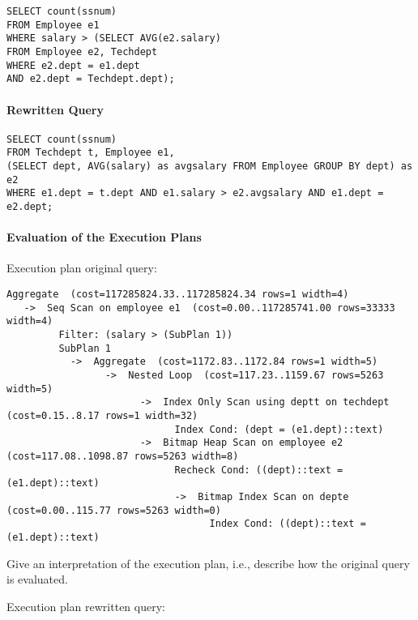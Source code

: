 \documentclass[11pt]{scrartcl}
\begin{document}
{\small
\begin{verbatim}
SELECT count(ssnum)
FROM Employee e1
WHERE salary > (SELECT AVG(e2.salary)
FROM Employee e2, Techdept
WHERE e2.dept = e1.dept
AND e2.dept = Techdept.dept);
\end{verbatim}
}

\paragraph{Rewritten Query}

{\small
\begin{verbatim}
SELECT count(ssnum)
FROM Techdept t, Employee e1, 
(SELECT dept, AVG(salary) as avgsalary FROM Employee GROUP BY dept) as e2
WHERE e1.dept = t.dept AND e1.salary > e2.avgsalary AND e1.dept = e2.dept;
\end{verbatim}
}

\paragraph{Evaluation of the Execution Plans}

Execution plan original query:

\begin{verbatim}
Aggregate  (cost=117285824.33..117285824.34 rows=1 width=4)
   ->  Seq Scan on employee e1  (cost=0.00..117285741.00 rows=33333 width=4)
         Filter: (salary > (SubPlan 1))
         SubPlan 1
           ->  Aggregate  (cost=1172.83..1172.84 rows=1 width=5)
                 ->  Nested Loop  (cost=117.23..1159.67 rows=5263 width=5)
                       ->  Index Only Scan using deptt on techdept  (cost=0.15..8.17 rows=1 width=32)
                             Index Cond: (dept = (e1.dept)::text)
                       ->  Bitmap Heap Scan on employee e2  (cost=117.08..1098.87 rows=5263 width=8)
                             Recheck Cond: ((dept)::text = (e1.dept)::text)
                             ->  Bitmap Index Scan on depte  (cost=0.00..115.77 rows=5263 width=0)
                                   Index Cond: ((dept)::text = (e1.dept)::text)
\end{verbatim}

Give an interpretation of the execution plan, i.e., describe how the
original query is evaluated.

Execution plan rewritten query:
\end{document}
